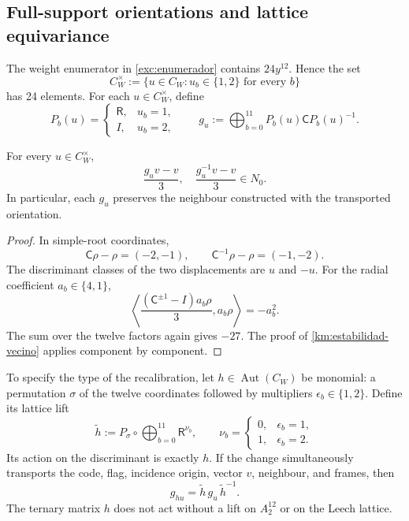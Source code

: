 \subsection{Full-support orientations and lattice equivariance}
\label{paper:24-orientaciones}

The weight enumerator in \eqref{exc:enumerador} contains
\(24y^{12}\). Hence the set
\[
 C_W^\times:=
 \{u\in C_W:u_b\in\{1,2\}\text{ for every }b\}
\]
has 24 elements. For each \(u\in C_W^\times\), define
\[
 P_b(u)=
 \begin{cases}
  \mathsf R,&u_b=1,\\
  I,&u_b=2,
 \end{cases}
 \qquad
 g_u:=\bigoplus_{b=0}^{11}P_b(u)\mathsf C P_b(u)^{-1}.
\]

\begin{proposition}
\label{paper:robustez-orientaciones}
For every \(u\in C_W^\times\),
\[
 \frac{g_uv-v}{3},
 \quad
 \frac{g_u^{-1}v-v}{3}
 \in N_0.
\]
In particular, each \(g_u\) preserves the neighbour constructed with the
transported orientation.
\end{proposition}

\begin{proof}
In simple-root coordinates,
\[
 \mathsf C\rho-\rho=(-2,-1),
 \qquad
 \mathsf C^{-1}\rho-\rho=(-1,-2).
\]
The discriminant classes of the two displacements are \(u\) and \(-u\).
For the radial coefficient \(a_b\in\{4,1\}\),
\[
 \left\langle
 \frac{(\mathsf C^{\pm1}-I)a_b\rho}{3},a_b\rho
 \right\rangle=-a_b^2.
\]
The sum over the twelve factors again gives \(-27\). The proof of
\cref{km:estabilidad-vecino} applies component by
component.
\end{proof}

To specify the type of the recalibration, let
\(h\in\operatorname{Aut}(C_W)\) be monomial: a permutation \(\sigma\) of
the twelve coordinates followed by multipliers
\(\epsilon_b\in\{1,2\}\). Define its lattice lift
\begin{equation}
 \widetilde h
 :=P_\sigma\circ
 \bigoplus_{b=0}^{11}\mathsf R^{\nu_b},
 \qquad
 \nu_b=
 \begin{cases}
 0,&\epsilon_b=1,\\
 1,&\epsilon_b=2.
 \end{cases}
 \label{paper:elevacion-monomial}
\end{equation}
Its action on the discriminant is exactly \(h\). If the change simultaneously transports
the code, flag, incidence origin, vector \(v\), neighbour, and
frames, then
\begin{equation}
 g_{hu}=\widetilde h\,g_u\,\widetilde h^{-1}.
 \label{paper:naturalidad-isometrias}
\end{equation}
The ternary matrix \(h\) does not act without a lift on \(A_2^{12}\) or on
the Leech lattice.

